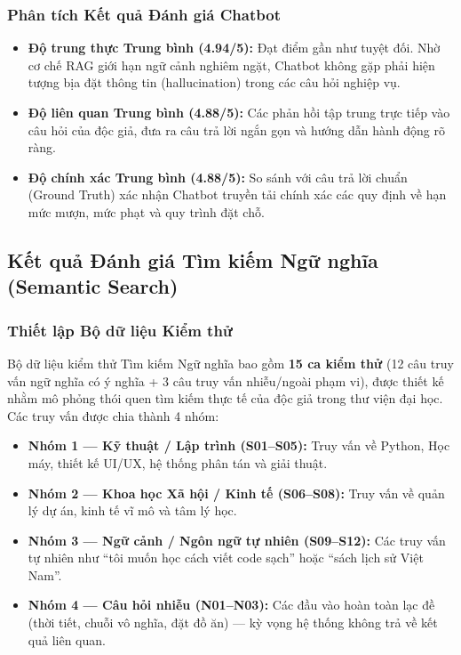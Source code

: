 \subsubsection{Phân tích Kết quả Đánh giá Chatbot}


\begin{itemize}
    \item \textbf{Độ trung thực Trung bình (4.94/5):} Đạt điểm gần như tuyệt đối. Nhờ cơ chế RAG giới hạn ngữ cảnh nghiêm ngặt, Chatbot không gặp phải hiện tượng bịa đặt thông tin (hallucination) trong các câu hỏi nghiệp vụ.
    \item \textbf{Độ liên quan Trung bình (4.88/5):} Các phản hồi tập trung trực tiếp vào câu hỏi của độc giả, đưa ra câu trả lời ngắn gọn và hướng dẫn hành động rõ ràng.
    \item \textbf{Độ chính xác Trung bình (4.88/5):} So sánh với câu trả lời chuẩn (Ground Truth) xác nhận Chatbot truyền tải chính xác các quy định về hạn mức mượn, mức phạt và quy trình đặt chỗ.
\end{itemize}

\subsection{Kết quả Đánh giá Tìm kiếm Ngữ nghĩa (Semantic Search)}

\subsubsection{Thiết lập Bộ dữ liệu Kiểm thử}

Bộ dữ liệu kiểm thử Tìm kiếm Ngữ nghĩa bao gồm \textbf{15 ca kiểm thử} (12 câu truy vấn ngữ nghĩa có ý nghĩa + 3 câu truy vấn nhiễu/ngoài phạm vi), được thiết kế nhằm mô phỏng thói quen tìm kiếm thực tế của độc giả trong thư viện đại học. Các truy vấn được chia thành 4 nhóm:

\begin{itemize}
    \item \textbf{Nhóm 1 --- Kỹ thuật / Lập trình (S01--S05):} Truy vấn về Python, Học máy, thiết kế UI/UX, hệ thống phân tán và giải thuật.
    \item \textbf{Nhóm 2 --- Khoa học Xã hội / Kinh tế (S06--S08):} Truy vấn về quản lý dự án, kinh tế vĩ mô và tâm lý học.
    \item \textbf{Nhóm 3 --- Ngữ cảnh / Ngôn ngữ tự nhiên (S09--S12):} Các truy vấn tự nhiên như ``tôi muốn học cách viết code sạch'' hoặc ``sách lịch sử Việt Nam''.
    \item \textbf{Nhóm 4 --- Câu hỏi nhiễu (N01--N03):} Các đầu vào hoàn toàn lạc đề (thời tiết, chuỗi vô nghĩa, đặt đồ ăn) --- kỳ vọng hệ thống không trả về kết quả liên quan.
\end{itemize}

